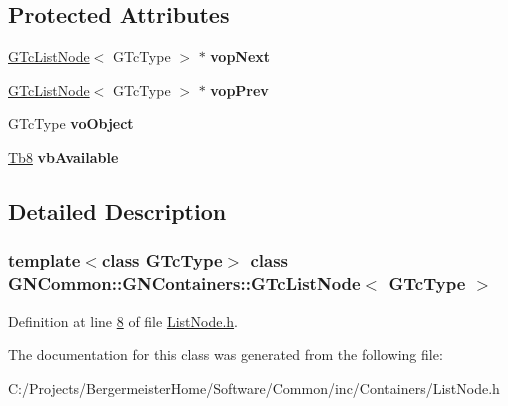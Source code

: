 \subsection*{Protected Attributes}
\begin{DoxyCompactItemize}
\item 
\mbox{\label{class_g_n_common_1_1_g_n_containers_1_1_g_tc_list_node_a3598f2d9cc2c1abc242320da83c5b39b}} 
\mbox{\hyperlink{class_g_n_common_1_1_g_n_containers_1_1_g_tc_list_node}{G\+Tc\+List\+Node}}$<$ G\+Tc\+Type $>$ $\ast$ {\bfseries vop\+Next}
\item 
\mbox{\label{class_g_n_common_1_1_g_n_containers_1_1_g_tc_list_node_a562fe7bfb5c331e3d4009a13579d90ac}} 
\mbox{\hyperlink{class_g_n_common_1_1_g_n_containers_1_1_g_tc_list_node}{G\+Tc\+List\+Node}}$<$ G\+Tc\+Type $>$ $\ast$ {\bfseries vop\+Prev}
\item 
\mbox{\label{class_g_n_common_1_1_g_n_containers_1_1_g_tc_list_node_a258ba42c4f6c775e823f2d2f2f20bd7f}} 
G\+Tc\+Type {\bfseries vo\+Object}
\item 
\mbox{\label{class_g_n_common_1_1_g_n_containers_1_1_g_tc_list_node_af598735f5ad4ae0277489d130cf931f5}} 
\mbox{\hyperlink{namespace_g_n_common_a8115dc7ed53b6e5b52e6bfde1632ea74}{Tb8}} {\bfseries vb\+Available}
\end{DoxyCompactItemize}


\subsection{Detailed Description}
\subsubsection*{template$<$class G\+Tc\+Type$>$\newline
class G\+N\+Common\+::\+G\+N\+Containers\+::\+G\+Tc\+List\+Node$<$ G\+Tc\+Type $>$}



Definition at line \mbox{\hyperlink{_list_node_8h_source_l00008}{8}} of file \mbox{\hyperlink{_list_node_8h_source}{List\+Node.\+h}}.



The documentation for this class was generated from the following file\+:\begin{DoxyCompactItemize}
\item 
C\+:/\+Projects/\+Bergermeister\+Home/\+Software/\+Common/inc/\+Containers/List\+Node.\+h\end{DoxyCompactItemize}
